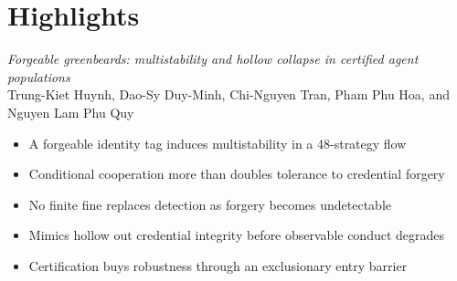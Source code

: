 \documentclass[12pt]{article}
\begin{document}
\section*{Highlights}
\textit{Forgeable greenbeards: multistability and hollow collapse in certified agent populations}\\[0.5em]
Trung-Kiet Huynh, Dao-Sy Duy-Minh, Chi-Nguyen Tran, Pham Phu Hoa, and Nguyen Lam Phu Quy\\[0.75em]
\begin{itemize}
\item A forgeable identity tag induces multistability in a 48-strategy flow
\item Conditional cooperation more than doubles tolerance to credential forgery
\item No finite fine replaces detection as forgery becomes undetectable
\item Mimics hollow out credential integrity before observable conduct degrades
\item Certification buys robustness through an exclusionary entry barrier
\end{itemize}
\end{document}
